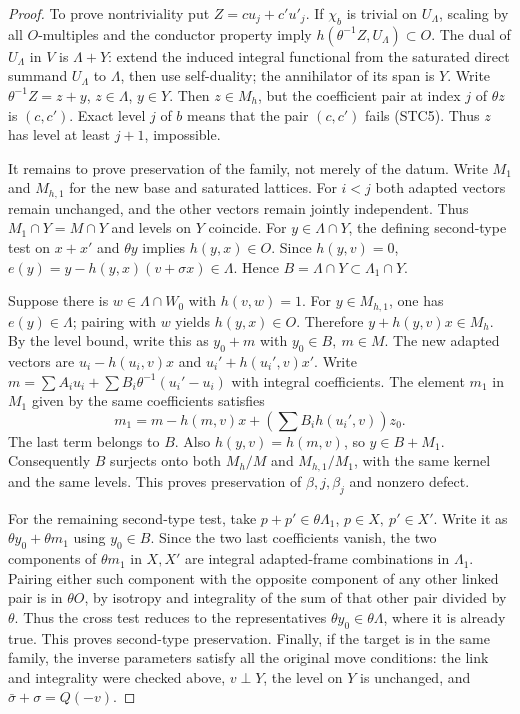 \begin{proof}
To prove nontriviality put \(Z=cu_j+c'u'_j\).
If \(\chi_b\) is trivial on \(U_\Lambda\), scaling
by all \(O\)-multiples and the conductor property
imply \(h(\theta^{-1}Z,U_\Lambda)\subset O\).
The dual of \(U_\Lambda\) in \(V\) is \(\Lambda+Y\):
extend the induced integral functional from the
saturated direct summand \(U_\Lambda\) to \(\Lambda\),
then use self-duality; the annihilator of its span
is \(Y\). Write \(\theta^{-1}Z=z+y\), \(z\in\Lambda\),
\(y\in Y\). Then \(z\in M_h\), but the coefficient
pair at index \(j\) of \(\theta z\) is \((c,c')\).
Exact level \(j\) of \(b\) means that the pair
\((c,c')\) fails (STC5). Thus \(z\) has level at
least \(j+1\), impossible.

It remains to prove preservation of the family,
not merely of the datum. Write \(M_1\) and \(M_{h,1}\)
for the new base and saturated lattices.
For \(i<j\) both adapted vectors remain unchanged,
and the other vectors remain jointly independent.
Thus \(M_1\cap Y=M\cap Y\) and levels on \(Y\)
coincide. For \(y\in\Lambda\cap Y\), the defining
second-type test on \(x+x'\) and \(\theta y\)
implies \(h(y,x)\in O\). Since \(h(y,v)=0\),
\(e(y)=y-h(y,x)(v+\sigma x)\in\Lambda\).
Hence \(B=\Lambda\cap Y\subset\Lambda_1\cap Y\).

Suppose there is \(w\in\Lambda\cap W_0\) with
\(h(v,w)=1\). For \(y\in M_{h,1}\), one has
\(e(y)\in\Lambda\); pairing with \(w\) yields
\(h(y,x)\in O\). Therefore
\(y+h(y,v)x\in M_h\). By the level bound, write
this as \(y_0+m\) with \(y_0\in B,\ m\in M\).
The new adapted vectors are \(u_i-h(u_i,v)x\)
and \(u_i'+h(u_i',v)x'\). Write
\(m=\sum A_i u_i+\sum B_i\theta^{-1}(u_i'-u_i)\)
with integral coefficients. The element \(m_1\)
in \(M_1\) given by the same coefficients satisfies
\[
 m_1=m-h(m,v)x+
        \left(\sum B_i h(u_i',v)\right)z_0 .
\]
The last term belongs to \(B\). Also
\(h(y,v)=h(m,v)\), so \(y\in B+M_1\).
Consequently \(B\) surjects onto both \(M_h/M\)
and \(M_{h,1}/M_1\), with the same kernel and
the same levels. This proves preservation of
\(\beta,j,\beta_j\) and nonzero defect.

For the remaining second-type test, take
\(p+p'\in\theta\Lambda_1\), \(p\in X,\ p'\in X'\).
Write it as \(\theta y_0+\theta m_1\) using
\(y_0\in B\). Since the two last coefficients
vanish, the two components of \(\theta m_1\)
in \(X,X'\) are integral adapted-frame combinations
in \(\Lambda_1\). Pairing either such component
with the opposite component of any other linked pair
is in \(\theta O\), by isotropy and integrality
of the sum of that other pair divided by \(\theta\).
Thus the cross test reduces to the representatives
\(\theta y_0\in\theta\Lambda\), where it is already true.
This proves second-type preservation. Finally, if
the target is in the same family, the inverse
parameters satisfy all the original move conditions:
the link and integrality were checked above,
\(v\perp Y\), the level on \(Y\) is unchanged,
and \(\bar\sigma+\sigma=Q(-v)\).
\end{proof}

